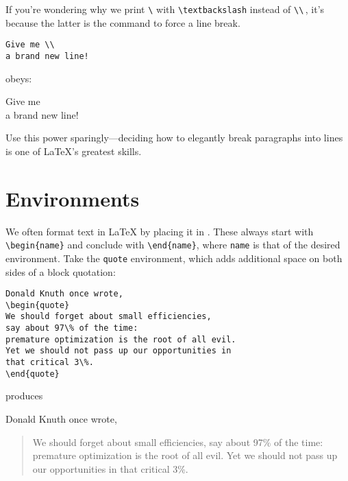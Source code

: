 If you're wondering why we print \texttt{\textbackslash} with
\verb|\textbackslash| instead of \verb|\\|\,,
it's because the latter is the command to force a line break.
\begin{leftfigure}
\begin{lstlisting}
Give me \\
a brand new line!
\end{lstlisting}
\end{leftfigure}
obeys:
\begin{leftfigure}
\lm Give me \\
a brand new line!
\end{leftfigure}
Use this power sparingly---deciding how to elegantly break paragraphs into
lines is one of \LaTeX{}'s greatest skills.

\section{Environments}

We often format text in \LaTeX{} by placing it in .
These always start with \verb|\begin{name}| and conclude with \verb|\end{name}|,
where \texttt{name} is that of the desired environment.
Take the \texttt{quote} environment,
which adds additional space on both sides of a block quotation:
\begin{leftfigure}
\begin{lstlisting}
Donald Knuth once wrote,
\begin{quote}
We should forget about small efficiencies,
say about 97\% of the time:
premature optimization is the root of all evil.
Yet we should not pass up our opportunities in
that critical 3\%.
\end{quote}
\end{lstlisting}
\end{leftfigure}
produces
\begin{leftfigure}
\lm
Donald Knuth once wrote,
\begin{quote}
We should forget about small efficiencies,
say about 97\% of the time:
premature optimization is the root of all evil.
Yet we should not pass up our opportunities in
that critical 3\%.
\end{quote}
\end{leftfigure}

